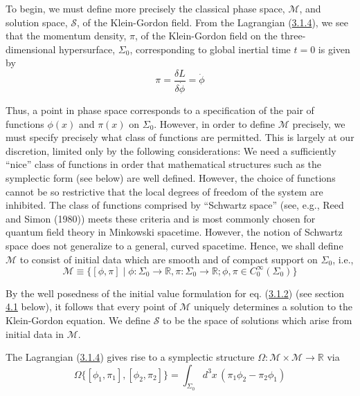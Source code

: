 \documentclass[11pt,a4paper]{article}
\begin{document}
To begin, we must define more precisely the classical phase space, \(\mathcal{M}\), and solution space, \(\mathcal{S}\), of the Klein-Gordon field. From the Lagrangian (\hyperref[eq:3.1.4]{3.1.4}), we see that the momentum density, \(\pi\), of the Klein-Gordon field on the three-dimensional hypersurface, \(\Sigma_0\), corresponding to global inertial time \(t=0\) is given by
\begin{equation*}
\pi=\frac{\delta L}{\delta\dot\phi}=\dot\phi \tag{3.2.1}\label{eq:3.2.1}
\end{equation*}

Thus, a point in phase space corresponds to a specification of the pair of functions \(\phi(x)\) and \(\pi(x)\) on \(\Sigma_0\). However, in order to define \(\mathcal{M}\) precisely, we must specify precisely what class of functions are permitted. This is largely at our discretion, limited only by the following considerations: We need a sufficiently ``nice'' class of functions in order that mathematical structures such as the symplectic form (see below) are well defined. However, the choice of functions cannot be so restrictive that the local degrees of freedom of the system are inhibited. The class of functions comprised by ``Schwartz space'' (see, e.g., Reed and Simon (1980)) meets these criteria and is most commonly chosen for quantum field theory in Minkowski spacetime. However, the notion of Schwartz space does not generalize to a general, curved spacetime. Hence, we shall define \(\mathcal{M}\) to consist of initial data which are smooth and of compact support on \(\Sigma_0\), i.e.,
\begin{equation*}
\mathcal{M} \equiv \{ [\phi, \pi] \mid \phi: \Sigma_0 \to \mathbb{R}, \pi: \Sigma_0 \to \mathbb{R}; \phi, \pi \in C_0^{\infty}(\Sigma_0) \} \tag{3.2.2}\label{eq:3.2.2}
\end{equation*}

By the well posedness of the initial value formulation for eq. (\hyperref[eq:3.1.2]{3.1.2}) (see section \hyperlink{sec:4.1}{4.1} below), it follows that every point of \(\mathcal{M}\) uniquely determines a solution to the Klein-Gordon equation. We define \(\mathcal{S}\) to \hypertarget{source-50}{} be the space of solutions which arise from initial data in \(\mathcal{M}\).

The Lagrangian (\hyperref[eq:3.1.4]{3.1.4}) gives rise to a symplectic structure \(\Omega: \mathcal{M} \times \mathcal{M} \to \mathbb{R}\) via
\begin{equation*}
\Omega\{[\phi_1, \pi_1], [\phi_2, \pi_2] \} = \int_{\Sigma_0} d^3x \, (\pi_1 \phi_2 - \pi_2 \phi_1) \tag{3.2.3}\label{eq:3.2.3}
\end{equation*}
\end{document}
